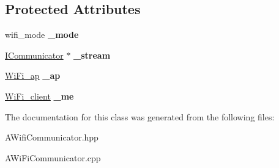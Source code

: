 \subsection*{Protected Attributes}
\begin{DoxyCompactItemize}
\item 
\mbox{\label{classwood_box_1_1communication_1_1_a_wi_fi_communicator_ac9195c5811ef0f4eebcfeecf9f0d1f9e}} 
wifi\+\_\+mode {\bfseries \+\_\+mode}
\item 
\mbox{\label{classwood_box_1_1communication_1_1_a_wi_fi_communicator_aade144c86e5fa9fbafec154238218a48}} 
\mbox{\hyperlink{classwood_box_1_1communication_1_1_i_communicator}{I\+Communicator}} $\ast$ {\bfseries \+\_\+stream}
\item 
\mbox{\label{classwood_box_1_1communication_1_1_a_wi_fi_communicator_aee3ecb9d4ba492654cc98df949419d14}} 
\mbox{\hyperlink{structs__wifi__access__point}{Wi\+Fi\+\_\+ap}} {\bfseries \+\_\+ap}
\item 
\mbox{\label{classwood_box_1_1communication_1_1_a_wi_fi_communicator_a9ea9ab9e7221b55843b196db9d82c324}} 
\mbox{\hyperlink{structs__wifi__client}{Wi\+Fi\+\_\+client}} {\bfseries \+\_\+me}
\end{DoxyCompactItemize}


The documentation for this class was generated from the following files\+:\begin{DoxyCompactItemize}
\item 
A\+Wifi\+Communicator.\+hpp\item 
A\+Wi\+Fi\+Communicator.\+cpp\end{DoxyCompactItemize}
